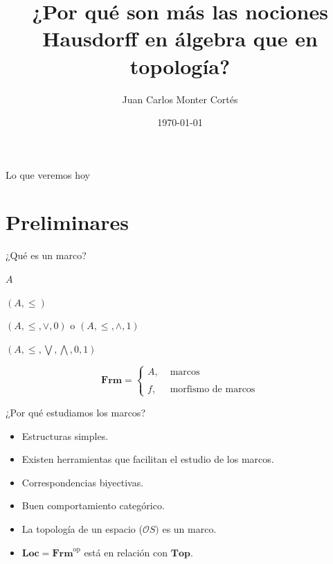 \documentclass[compress,12pt]{beamer}
\title{¿Por qué son más las nociones Hausdorff en álgebra que en topología?}
\date{\today}
\author{Juan Carlos Monter Cortés}
\institute{Universidad de Guadalajara}
\DeclareMathOperator{\op}{op}
\begin{document}
\frame[plain]{\titlepage}

\begin{frame}{Lo que veremos hoy \smiley}
\tableofcontents %
\end{frame}

\section{Preliminares}

\begin{frame}{¿Qué es un marco?}
    \begin{itemize}
    \begin{multicols}{2}
        \item $A$
        \item $(A, \leq)$
        \item $(A, \leq, \vee, 0)$ o $(A, \leq, \wedge, 1)$
        \item $(A, \leq, \bigvee, \bigwedge, 0, 1)$
    \end{multicols} 
    \end{itemize}


    \[
    \mathbf{Frm}=\left\{ \begin{array}{ll} A, & \mbox{ marcos}\\ \\  f, & \mbox{ morfismo de marcos} \end{array} \right.
    \]
\end{frame}

\begin{frame}{¿Por qué estudiamos los marcos?}
    \begin{itemize}
        \item Estructuras simples.
        \item<2-> Existen herramientas que facilitan el estudio de los marcos.
        \item<3-> Correspondencias biyectivas.
        \item<4-> Buen comportamiento categórico.
        \item<5-> \alert<7->{La topología de un espacio ($\mathcal{O}S)$ es un marco.}
        \item<6-> $\mathbf{Loc}=\mathbf{Frm}^{\op}$ está en relación con $\mathbf{Top}$.
    \end{itemize}
\end{frame}
\end{document}
